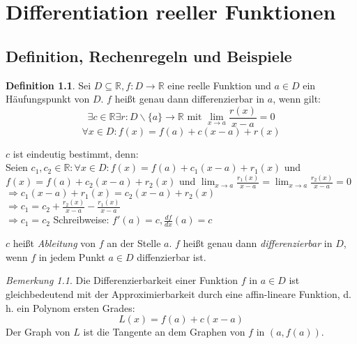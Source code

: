 \documentclass[ngerman,titlepage,twoside, parskip=half*]{scrreprt}
\newcommand*{\R}{\mathbb{R}}
\theoremstyle{plain}
\theoremstyle{definition}
\newtheorem{definition}{Definition}
\theoremstyle{remark}
\newtheorem*{remark}{Bemerkung}
\begin{document}
\chapter{Differentiation reeller Funktionen}
\section{Definition, Rechenregeln und Beispiele}

\begin{definition}
Sei $D\subseteq \R, f\colon D\rightarrow\R$ eine reelle Funktion und $a\in D$ ein Häuf\-ungs\-punkt von $D$. $f$
heißt genau dann differenzierbar in $a$, wenn gilt:
\[\exists c \in\R \exists r\colon D\backslash\{a\}\rightarrow\R \text{ mit } \lim_{x\rightarrow a}
\frac{r(x)}{x-a}=0\]
\[\forall x \in D\colon f(x)=f(a)+c(x-a)+r(x)\]
\end{definition}

$c$ ist eindeutig bestimmt, denn:\\
Seien $c_1,c_2 \in \R\colon \forall x \in D\colon f(x)=f(a)+c_1(x-a)+r_1(x)$ und $f(x)=f(a)+c_2(x-a)+r_2(x)$ und
$\lim_{x\rightarrow a}\frac{r_1(x)}{x-a}=\lim_{x\rightarrow a}\frac{r_2(x)}{x-a}=0$\\
$\Rightarrow c_1(x-a)+r_1(x)=c_2(x-a)+r_2(x)$\\
$\Rightarrow c_1=c_2+\frac{r_2(x)}{x-a}-\frac{r_1(x)}{x-a}$\\
$\Rightarrow c_1=c_2$
Schreibweise: $f'(a)=c, \frac{df}{dx}(a)=c$

$c$ heißt \emph{Ableitung} von $f$ an der Stelle $a$. $f$ heißt genau dann
\emph{differenzierbar} in $D$, wenn $f$ in jedem Punkt $a\in D$ diffenzierbar ist.

\begin{remark}
Die Differenzierbarkeit einer Funktion $f$ in $a\in D$ ist gleich\-be\-deu\-tend mit der Approximierbarkeit
durch eine affin-lineare Funktion, d.\,h. ein Polynom ersten Grades:
\[L(x)=f(a)+c(x-a)\]
Der Graph von $L$ ist die Tangente an dem Graphen von $f$ in $(a,f(a))$.
\end{remark}
\end{document}
